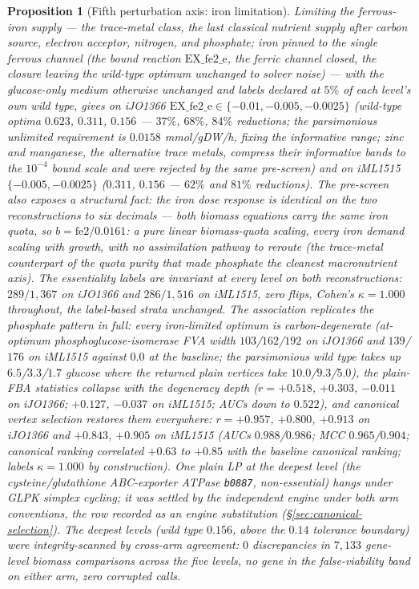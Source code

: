 \documentclass[11pt,a4paper]{article}
\theoremstyle{plain}
\newtheorem{proposition}[theorem]{Proposition}
\theoremstyle{definition}
\theoremstyle{remark}
\begin{document}
\begin{proposition}[Fifth perturbation axis: iron limitation]
\label{prop:keio-iron}
Limiting the ferrous-iron supply --- the trace-metal class, the last
classical nutrient supply after carbon source, electron acceptor,
nitrogen, and phosphate; iron pinned to the single ferrous channel
(the bound reaction $\mathrm{EX\_fe2\_e}$, the ferric channel
closed, the closure leaving the wild-type optimum unchanged to
solver noise) --- with the glucose-only medium otherwise unchanged
and labels declared at $5\%$ of each level's own wild type, gives
on iJO1366 $\mathrm{EX\_fe2\_e}\in\{-0.01,-0.005,-0.0025\}$
(wild-type optima $0.623$, $0.311$, $0.156$ --- $37\%$, $68\%$,
$84\%$ reductions; the parsimonious unlimited requirement is
$0.0158$ mmol/gDW/h, fixing the informative range; zinc and
manganese, the alternative trace metals, compress their informative
bands to the $10^{-4}$ bound scale and were rejected by the same
pre-screen) and on iML1515 $\{-0.005,-0.0025\}$ ($0.311$, $0.156$
--- $62\%$ and $81\%$ reductions). The pre-screen also exposes a
structural fact: the iron dose response is identical on the two
reconstructions to six decimals --- both biomass equations carry
the same iron quota, so $b=\mathrm{fe2}/0.0161$: a pure linear
biomass-quota scaling, every iron demand scaling with growth, with
no assimilation pathway to reroute (the trace-metal counterpart of
the quota purity that made phosphate the cleanest macronutrient
axis). The essentiality labels are invariant at every level on
both reconstructions: $289/1{,}367$ on iJO1366 and $286/1{,}516$
on iML1515, zero flips, Cohen's $\kappa=1.000$ throughout, the
label-based strata unchanged. The association replicates the
phosphate pattern in full: every iron-limited optimum is
carbon-degenerate (at-optimum phosphoglucose-isomerase FVA width
$103$/$162$/$192$ on iJO1366 and $139$/$176$ on iML1515 against
$0.0$ at the baseline; the parsimonious wild type takes up
$6.5$/$3.3$/$1.7$ glucose where the returned plain vertices take
$10.0$/$9.3$/$5.0$), the plain-FBA statistics collapse with the
degeneracy depth ($r=+0.518$, $+0.303$, $-0.011$ on iJO1366;
$+0.127$, $-0.037$ on iML1515; AUCs down to $0.522$), and
canonical vertex selection restores them everywhere: $r=+0.957$,
$+0.800$, $+0.913$ on iJO1366 and $+0.843$, $+0.905$ on iML1515
(AUCs $0.988$/$0.986$; MCC $0.965$/$0.904$; canonical ranking
correlated $+0.63$ to $+0.85$ with the baseline canonical ranking;
labels $\kappa=1.000$ by construction). One plain LP at the
deepest level (the cysteine/glutathione ABC-exporter ATPase
\texttt{b0887}, non-essential) hangs under GLPK simplex cycling;
it was settled by the independent engine under both arm
conventions, the row recorded as an engine substitution
(\S\ref{sec:canonical-selection}). The deepest levels (wild type
$0.156$, above the $0.14$ tolerance boundary) were
integrity-scanned by cross-arm agreement: $0$ discrepancies in
$7{,}133$ gene-level biomass comparisons across the five levels,
no gene in the false-viability band on either arm, zero corrupted
calls.
\end{proposition}
\end{document}
